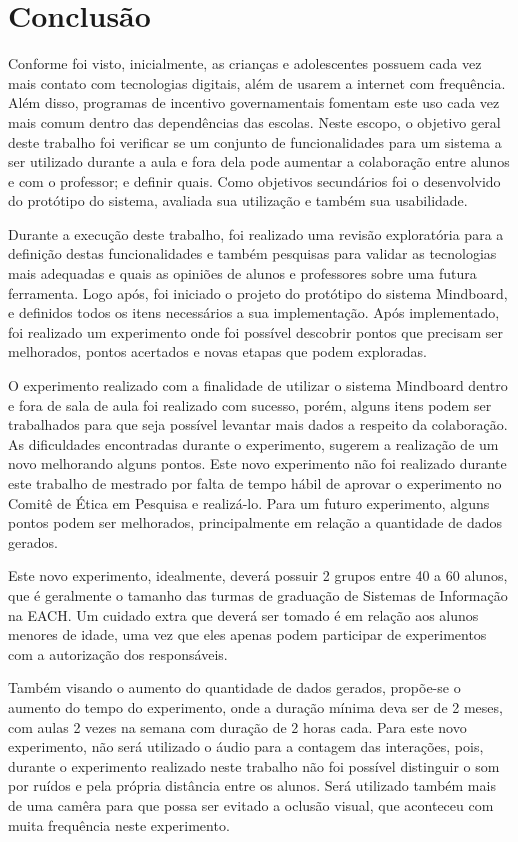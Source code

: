 \chapter{Conclusão}
\label{cap:conclusao}

Conforme foi visto, inicialmente, as crianças e adolescentes possuem cada vez mais contato com tecnologias digitais, além de usarem a internet com frequência. Além disso, programas de incentivo governamentais fomentam este uso cada vez mais comum dentro das dependências das escolas. Neste escopo, o objetivo geral deste trabalho foi verificar se um conjunto de funcionalidades para um sistema a ser utilizado durante a aula e fora dela pode aumentar a colaboração entre alunos e com o professor; e definir quais. Como objetivos secundários foi o desenvolvido do protótipo do sistema, avaliada sua utilização e também sua usabilidade.

Durante a execução deste trabalho, foi realizado uma revisão exploratória para a definição destas funcionalidades e também pesquisas para validar as tecnologias mais adequadas e quais as opiniões de alunos e professores sobre uma futura ferramenta. Logo após, foi iniciado o projeto do protótipo do sistema Mindboard, e definidos todos os itens necessários a sua implementação. Após implementado, foi realizado um experimento onde foi possível descobrir pontos que precisam ser melhorados, pontos acertados e novas etapas que podem exploradas.

O experimento realizado com a finalidade de utilizar o sistema Mindboard dentro e fora de sala de aula foi realizado com sucesso, porém, alguns itens podem ser trabalhados para que seja possível levantar mais dados a respeito da colaboração. As dificuldades encontradas durante o experimento, sugerem a realização de um novo melhorando alguns pontos. Este novo experimento não foi realizado durante este trabalho de mestrado por falta de tempo hábil de aprovar o experimento no Comitê de Ética em Pesquisa e realizá-lo. Para um futuro experimento, alguns pontos podem ser melhorados, principalmente em relação a quantidade de dados gerados.

Este novo experimento, idealmente, deverá possuir 2 grupos entre 40 a 60 alunos, que é geralmente o tamanho das turmas de graduação de Sistemas de Informação na EACH. Um cuidado extra que deverá ser tomado é em relação aos alunos menores de idade, uma vez que eles apenas podem participar de experimentos com a autorização dos responsáveis.

Também visando o aumento do quantidade de dados gerados, propõe-se o aumento do tempo do experimento, onde a duração mínima deva ser de 2 meses, com aulas 2 vezes na semana com duração de 2 horas cada. Para este novo experimento, não será utilizado o áudio para a contagem das interações, pois, durante o experimento realizado neste trabalho não foi possível distinguir o som por ruídos e pela própria distância entre os alunos. Será utilizado também mais de uma camêra para que possa ser evitado a oclusão visual, que aconteceu com muita frequência neste experimento.

